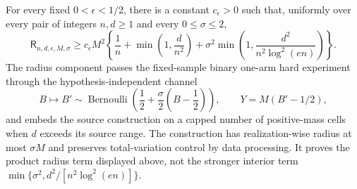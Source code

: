 For every fixed \(0<\epsilon<1/2\), there is a constant \(c_{\epsilon}>0\) such that, uniformly over every pair of integers \(n,d\ge1\) and every \(0\le\sigma\le2\),
\[
 \mathsf R_{n,d,\epsilon,M,\sigma}
 \ge c_{\epsilon}M^2\left\{
 \frac1n+\min\left(1,\frac d{n^2}\right)
 +\sigma^2\min\left(1,\frac{d^2}{n^2\log^2(en)}\right)
 \right\}.
\]
The radius component passes the fixed-sample binary one-arm hard experiment through the hypothesis-independent channel
\[
 B\longmapsto B'\sim\operatorname{Bernoulli}\!\left(\frac12+\frac\sigma2\left(B-\frac12\right)\right),
 \qquad Y=M(B'-1/2),
\]
and embeds the source construction on a capped number of positive-mass cells when \(d\) exceeds its source range.  The construction has realization-wise radius at most \(\sigma M\) and preserves total-variation control by data processing.  It proves the product radius term displayed above, not the stronger interior term \(\min\{\sigma^2,d^2/[n^2\log^2(en)]\}\).